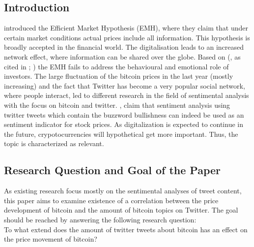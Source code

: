\documentclass[a4paper,american,12pt]{article}
\begin{document}
\begin{spacing}{1.2}
\cleardoublepage{}
\section{Introduction}
\label{sec:intro}
\textcite[p.~388]{malkiel1970efficient} introduced the Efficient Market Hypothesis (EMH), where they claim that under certain market conditions actual prices include all information. This hypothesis is broadly accepted in the financial world. The digitalisation leads to an increased network effect, where information can be shared over the globe. Based on \citeauthor{mao2015quantifying} (\citeyear[][p.~3]{mao2015quantifying}, as cited in \cite[][pp.~175--195]{shiller2015irrational}; \cite[][pp.~279]{kahneman2013prospect}) the EMH fails to address the behavioural and emotional role of investors. The large fluctuation of the bitcoin prices in the last year (mostly increasing) and the fact that Twitter has become a very popular social network, where people interact, led to different research in the field of sentimental analysis with the focus on bitcoin and twitter. \textcite[p.~18]{mao2015quantifying}, claim that sentiment analysis using twitter tweets which contain the buzzword bullishness can indeed be used as an sentiment indicator for stock prices. As digitalization is expected to continue in the future, crypotocurrencies will hypothetical get more important. Thus, the topic is characterized as relevant.

\subsection{Research Question and Goal of the Paper}
\label{sec:ResearchQandGoal}
As existing research focus mostly on the sentimental analyses of tweet content, this paper aims to examine existence of a correlation between the price development of bitcoin and the amount of bitcoin topics on Twitter. The goal should be reached by answering the following research question: \\
To what extend does the amount of twitter tweets about bitcoin has an effect on the price movement of bitcoin?


\end{spacing}
\end{document}
